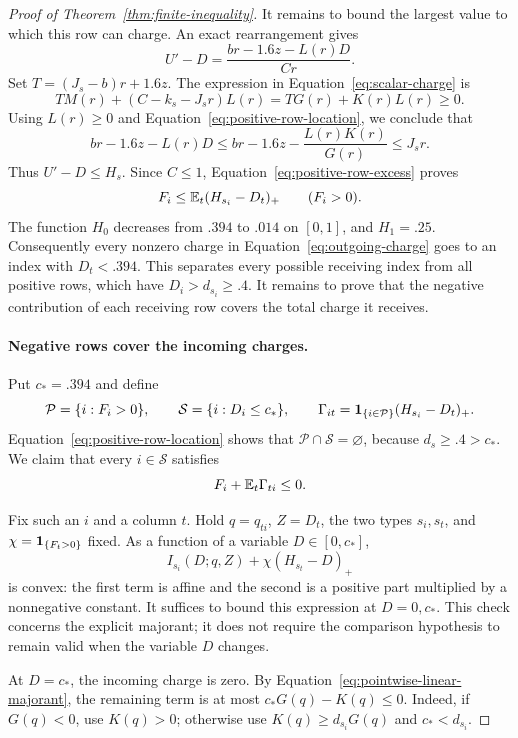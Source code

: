 \begin{proof}[Proof of Theorem~\ref{thm:finite-inequality}]
It remains to bound the largest value to which this row can charge.
An exact rearrangement gives
\[
 U'-D=\frac{br-1.6z-L(r)D}{Cr}.
\]
Set $T=(J_s-b)r+1.6z$.  The expression in
Equation~\eqref{eq:scalar-charge} is
\begin{equation}
\label{eq:charge-scalar-rearrangement}
 TM(r)+(C-k_s-J_sr)L(r)=TG(r)+K(r)L(r)\ge0.
\end{equation}
Using $L(r)\ge0$ and Equation~\eqref{eq:positive-row-location},
we conclude that
\[
 br-1.6z-L(r)D
 \le br-1.6z-\frac{L(r)K(r)}{G(r)}\le J_sr.
\]
Thus $U'-D\le H_s$.  Since $C\le1$,
Equation~\eqref{eq:positive-row-excess} proves
\begin{equation}
\label{eq:outgoing-charge}
 F_i\le\mathbb E_t(H_{s_i}-D_t)_+\qquad(F_i>0).
\end{equation}
The function $H_0$ decreases from $.394$ to $.014$ on $[0,1]$,
and $H_1=.25$.  Consequently every nonzero charge in
Equation~\eqref{eq:outgoing-charge} goes to an index with $D_t<.394$.
This separates every possible receiving index from all positive rows,
which have $D_i>d_{s_i}\ge.4$. It remains to prove that the negative
contribution of each receiving row covers the total charge it receives.

\paragraph{Negative rows cover the incoming charges.}
Put $c_*=.394$ and define
\[
 \mathcal P=\{i:F_i>0\},\qquad
 \mathcal S=\{i:D_i\le c_*\},\qquad
 \Gamma_{it}=\mathbf 1_{\{i\in\mathcal P\}}(H_{s_i}-D_t)_+.
\]
Equation~\eqref{eq:positive-row-location} shows that
$\mathcal P\cap\mathcal S=\varnothing$, because $d_s\ge.4>c_*$.
We claim that every $i\in\mathcal S$ satisfies
\begin{equation}
\label{eq:incoming-charge}
 F_i+\mathbb E_t\Gamma_{ti}\le0.
\end{equation}

Fix such an $i$ and a column $t$.  Hold $q=q_{ti}$, $Z=D_t$,
the two types $s_i,s_t$, and $\chi=\mathbf 1_{\{F_t>0\}}$ fixed.
As a function of a variable $D\in[0,c_*]$,
\[
 I_{s_i}(D;q,Z)+\chi(H_{s_t}-D)_+
\]
is convex: the first term is affine and the second is a positive part
multiplied by a nonnegative constant.  It suffices to bound this
expression at $D=0,c_*$.  This check concerns the explicit majorant;
it does not require the comparison hypothesis to remain valid when
the variable $D$ changes.

At $D=c_*$, the incoming charge is zero.  By
Equation~\eqref{eq:pointwise-linear-majorant}, the remaining term is
at most $c_*G(q)-K(q)\le0$.  Indeed, if $G(q)<0$, use $K(q)>0$;
otherwise use $K(q)\ge d_{s_i}G(q)$ and $c_*<d_{s_i}$.


\end{proof}
